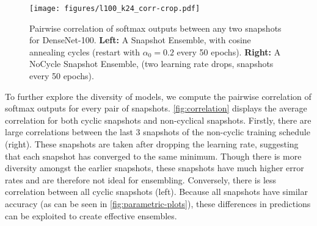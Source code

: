 

 \begin{wrapfigure}{r}{0.5\textwidth}
    \centering
    \texttt{[image: figures/l100\_k24\_corr-crop.pdf]}
    \caption{\small Pairwise correlation of softmax outputs between any two snapshots for DenseNet-100. {\bf Left:} A Snapshot Ensemble, with cosine annealing cycles (restart with $\alpha_0=0.2$ every 50 epochs). {\bf Right:} A NoCycle Snapshot Ensemble, (two learning rate drops, snapshots every 50 epochs).}
    \label{fig:correlation}
\end{wrapfigure}
 To further explore the diversity of models, we compute the pairwise correlation of softmax outputs for every pair of snapshots. \autoref{fig:correlation} displays the average correlation for both cyclic snapshots and non-cyclical snapshots. Firstly, there are large correlations between the last 3 snapshots of the non-cyclic training schedule (right). These snapshots are taken after dropping the learning rate, suggesting that each snapshot has converged to the same minimum. Though there is more diversity amongst the earlier snapshots, these snapshots have much higher error rates and are therefore not ideal for ensembling. Conversely, there is less correlation between all cyclic snapshots (left). Because all snapshots have similar accuracy (as can be seen in \autoref{fig:parametric-plots}), these differences in predictions can be exploited to create effective ensembles.

